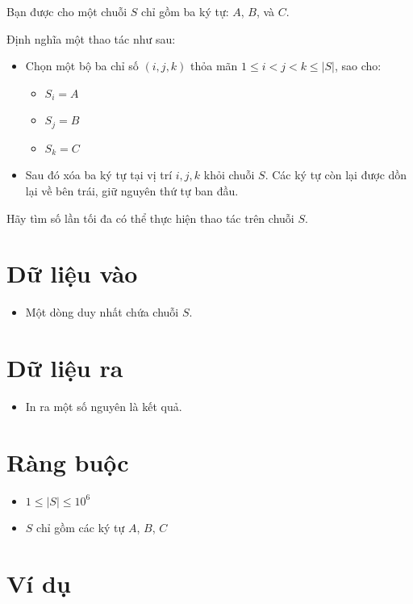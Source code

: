 Bạn được cho một chuỗi $S$ chỉ gồm ba ký tự: $A$, $B$, và $C$.

Định nghĩa một thao tác như sau:
\begin{itemize}
    \item Chọn một bộ ba chỉ số $(i, j, k)$ thỏa mãn $1 \le i < j < k \le |S|$, sao cho:
    \begin{itemize}
        \item $S_i = A$
        \item $S_j = B$
        \item $S_k = C$
    \end{itemize}
    \item Sau đó xóa ba ký tự tại vị trí $i, j, k$ khỏi chuỗi $S$. Các ký tự còn lại được dồn lại về bên trái, giữ nguyên thứ tự ban đầu.
\end{itemize}

Hãy tìm số lần tối đa có thể thực hiện thao tác trên chuỗi $S$.

\section*{Dữ liệu vào}

\begin{itemize}
    \item Một dòng duy nhất chứa chuỗi $S$.
\end{itemize}

\section*{Dữ liệu ra}

\begin{itemize}
    \item In ra một số nguyên là kết quả.
\end{itemize}

\section*{Ràng buộc}

\begin{itemize}
    \item $1 \le |S| \le 10^6$
    \item $S$ chỉ gồm các ký tự $A$, $B$, $C$
\end{itemize}

\section*{Ví dụ}

